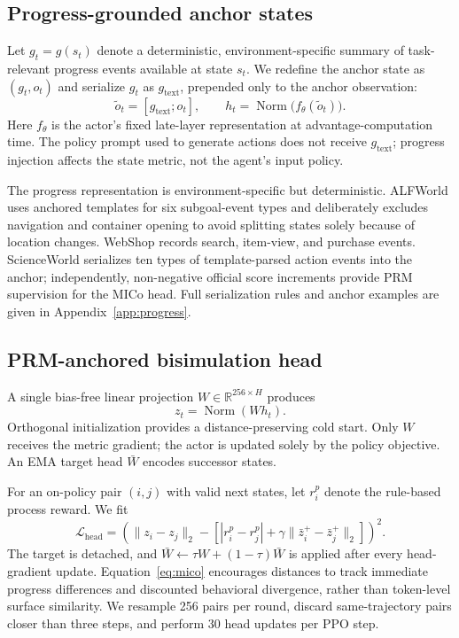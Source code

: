\documentclass[10pt,twocolumn,letterpaper]{article}
\begin{document}
\subsection{Progress-grounded anchor states}
Let $g_t=g(s_t)$ denote a deterministic, environment-specific summary of task-relevant progress events available at state $s_t$. We redefine the anchor state as $(g_t,o_t)$ and serialize $g_t$ as $g_{\mathrm{text}}$, prepended only to the anchor observation:
\begin{equation}
\tilde o_t=[g_{\mathrm{text}};o_t],\qquad
h_t=\operatorname{Norm}\bigl(f_\theta(\tilde o_t)\bigr).
\end{equation}
Here $f_\theta$ is the actor's fixed late-layer representation at advantage-computation time. The policy prompt used to generate actions does not receive $g_{\mathrm{text}}$; progress injection affects the state metric, not the agent's input policy.

The progress representation is environment-specific but deterministic. ALFWorld uses anchored templates for six subgoal-event types and deliberately excludes navigation and container opening to avoid splitting states solely because of location changes. WebShop records search, item-view, and purchase events. ScienceWorld serializes ten types of template-parsed action events into the anchor; independently, non-negative official score increments provide PRM supervision for the MICo head. Full serialization rules and anchor examples are given in Appendix~\ref{app:progress}.

\subsection{PRM-anchored bisimulation head}
A single bias-free linear projection $W\in\mathbb R^{256\times H}$ produces
\begin{equation}
z_t=\operatorname{Norm}(Wh_t).
\end{equation}
Orthogonal initialization provides a distance-preserving cold start. Only $W$ receives the metric gradient; the actor is updated solely by the policy objective. An EMA target head $\bar W$ encodes successor states.

For an on-policy pair $(i,j)$ with valid next states, let $r_i^p$ denote the rule-based process reward. We fit
\begin{equation}
\mathcal L_{\mathrm{head}}=
\left(\|z_i-z_j\|_2-
\left[|r_i^p-r_j^p|+\gamma\|\bar z_i^{+}-\bar z_j^{+}\|_2\right]\right)^2.
\label{eq:mico}
\end{equation}
The target is detached, and $\bar W\leftarrow\tau W+(1-\tau)\bar W$ is applied after every head-gradient update. Equation~\ref{eq:mico} encourages distances to track immediate progress differences and discounted behavioral divergence, rather than token-level surface similarity. We resample 256 pairs per round, discard same-trajectory pairs closer than three steps, and perform 30 head updates per PPO step.
\end{document}
